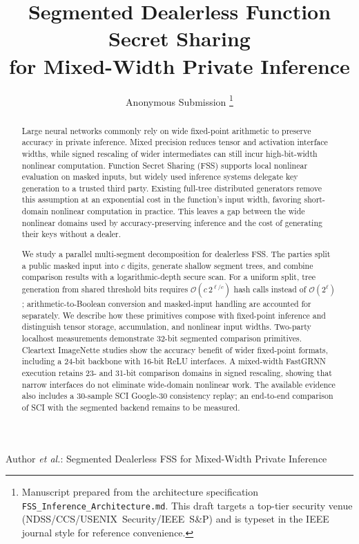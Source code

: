 \documentclass[journal]{IEEEtran}
\theoremstyle{definition}
\theoremstyle{plain}
\newcommand{\bigO}{\mathcal{O}}
\newcommand{\nseg}{c}                              %
\begin{document}
\title{Segmented Dealerless Function Secret Sharing\\ for Mixed-Width Private Inference}

\author{Anonymous Submission%
\thanks{Manuscript prepared from the architecture specification
\texttt{FSS\_Inference\_Architecture.md}. This draft targets a top-tier
security venue (NDSS/CCS/USENIX~Security/IEEE~S\&P) and is typeset in the
IEEE journal style for reference convenience.}}

%
{Author \MakeLowercase{\textit{et al.}}: Segmented Dealerless FSS for Mixed-Width Private Inference}

\maketitle

\begin{abstract}
Large neural networks commonly rely on wide fixed-point arithmetic to preserve
accuracy in private inference. Mixed precision reduces tensor and activation
interface widths, while signed rescaling of wider intermediates can still incur
high-bit-width nonlinear computation. Function Secret Sharing (FSS) supports
local nonlinear evaluation on masked inputs, but widely used inference systems
delegate key generation to a trusted third party. Existing full-tree distributed
generators remove this assumption at an exponential cost in the function's
input width, favoring short-domain nonlinear computation in practice. This
leaves a gap between the wide nonlinear domains used by accuracy-preserving
inference and the cost of generating their keys without a dealer.

We study a parallel multi-segment decomposition for dealerless FSS. The parties
split a public masked input into $\nseg$ digits, generate shallow segment trees,
and combine comparison results with a logarithmic-depth secure scan. For a
uniform split, tree generation from shared threshold bits requires
$\bigO(\nseg\,2^{\ell/\nseg})$ hash calls instead of $\bigO(2^\ell)$;
arithmetic-to-Boolean conversion and masked-input handling are accounted for
separately. We describe how these primitives compose with fixed-point inference
and distinguish tensor storage, accumulation, and nonlinear input widths.
Two-party localhost measurements demonstrate 32-bit segmented comparison
primitives. Cleartext ImageNette studies show the accuracy benefit of wider
fixed-point formats, including a 24-bit backbone with 16-bit ReLU interfaces.
A mixed-width FastGRNN execution retains 23- and 31-bit comparison domains in
signed rescaling, showing that narrow interfaces do not eliminate wide-domain
nonlinear work. The available evidence also includes a 30-sample SCI Google-30
consistency replay; an end-to-end comparison of SCI with the segmented backend
remains to be measured.
\end{abstract}
\end{document}
